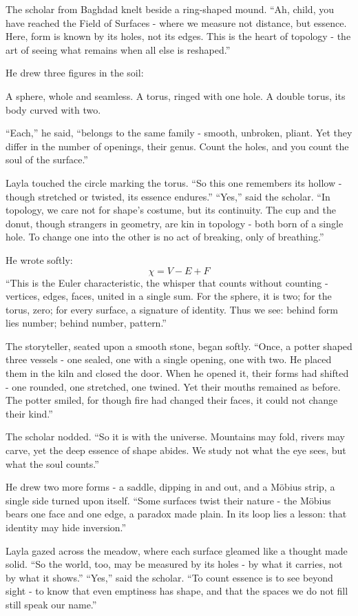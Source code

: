 \documentclass[
  letterpaper,
  DIV=11,
  numbers=noendperiod]{scrreprt}
\begin{document}
The scholar from Baghdad knelt beside a ring-shaped mound. ``Ah, child,
you have reached the Field of Surfaces - where we measure not distance,
but essence. Here, form is known by its holes, not its edges. This is
the heart of topology - the art of seeing what remains when all else is
reshaped.''

He drew three figures in the soil:

A sphere, whole and seamless. A torus, ringed with one hole. A double
torus, its body curved with two.

``Each,'' he said, ``belongs to the same family - smooth, unbroken,
pliant. Yet they differ in the number of openings, their genus. Count
the holes, and you count the soul of the surface.''

Layla touched the circle marking the torus. ``So this one remembers its
hollow - though stretched or twisted, its essence endures.'' ``Yes,''
said the scholar. ``In topology, we care not for shape's costume, but
its continuity. The cup and the donut, though strangers in geometry, are
kin in topology - both born of a single hole. To change one into the
other is no act of breaking, only of breathing.''

He wrote softly: \[
\chi = V - E + F
\] ``This is the Euler characteristic, the whisper that counts without
counting - vertices, edges, faces, united in a single sum. For the
sphere, it is two; for the torus, zero; for every surface, a signature
of identity. Thus we see: behind form lies number; behind number,
pattern.''

The storyteller, seated upon a smooth stone, began softly. ``Once, a
potter shaped three vessels - one sealed, one with a single opening, one
with two. He placed them in the kiln and closed the door. When he opened
it, their forms had shifted - one rounded, one stretched, one twined.
Yet their mouths remained as before. The potter smiled, for though fire
had changed their faces, it could not change their kind.''

The scholar nodded. ``So it is with the universe. Mountains may fold,
rivers may carve, yet the deep essence of shape abides. We study not
what the eye sees, but what the soul counts.''

He drew two more forms - a saddle, dipping in and out, and a Möbius
strip, a single side turned upon itself. ``Some surfaces twist their
nature - the Möbius bears one face and one edge, a paradox made plain.
In its loop lies a lesson: that identity may hide inversion.''

Layla gazed across the meadow, where each surface gleamed like a thought
made solid. ``So the world, too, may be measured by its holes - by what
it carries, not by what it shows.'' ``Yes,'' said the scholar. ``To
count essence is to see beyond sight - to know that even emptiness has
shape, and that the spaces we do not fill still speak our name.''
\end{document}
